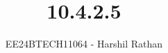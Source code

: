 \documentclass[journal]{IEEEtran}
\begin{document}
	
	
	\vspace{3cm}
	
	\title{10.4.2.5}
	\author{EE24BTECH11064 - Harshil Rathan}
	{\let\newpage\relax\maketitle}
	
	\renewcommand{\thefigure}{\theenumi}
	\renewcommand{\thetable}{\theenumi}
	\setlength{\intextsep}{10pt} %
	
	
	\renewcommand{\thetable}{\theenumi}
	
\end{document}
